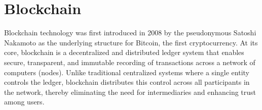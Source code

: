 \section{Blockchain}\label{cTGE}

Blockchain technology was first introduced in 2008 by the pseudonymous Satoshi Nakamoto as the underlying structure for Bitcoin, the first cryptocurrency. At its core, blockchain is a decentralized and distributed ledger system that enables secure, transparent, and immutable recording of transactions across a network of computers (nodes). Unlike traditional centralized systems where a single entity controls the ledger, blockchain distributes this control across all participants in the network, thereby eliminating the need for intermediaries and enhancing trust among users.
 \\


